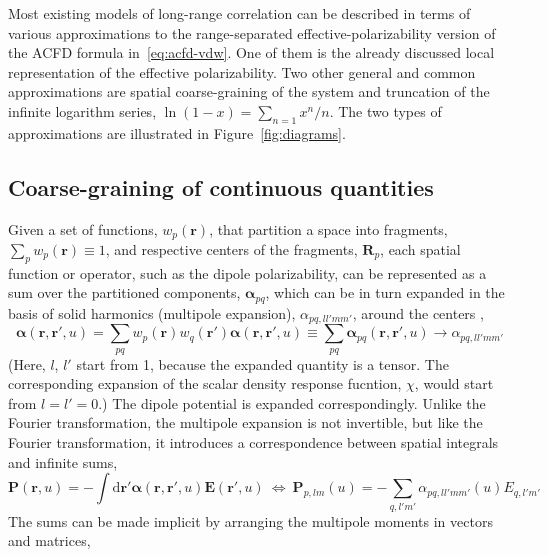 Most existing models of long-range correlation can be described in terms of various approximations to the range-separated effective-polarizability version of the ACFD formula in~\eqref{eq:acfd-vdw}.
One of them is the already discussed local representation of the effective polarizability.
Two other general and common approximations are spatial coarse-graining of the system and truncation of the infinite logarithm series, $\ln(1-x)=\sum_{n=1}x^n/n$.
The two types of approximations are illustrated in Figure~\ref{fig:diagrams}.

\subsection{Coarse-graining of continuous quantities}\label{sec:coarse-graining}

Given a set of functions, $w_p(\mathbf r)$, that partition a space into fragments, $\sum_p w_p(\mathbf r)\equiv1$, and respective centers of the fragments, $\mathbf R_p$, each spatial function or operator, such as the dipole polarizability, can be represented as a sum over the partitioned components, $\boldsymbol\alpha_{pq}$, which can be in turn expanded in the basis of solid harmonics (multipole expansion), $\alpha_{pq,ll'mm'}$, around the centers \citep{Stone13},
\begin{equation}
  \boldsymbol\alpha(\mathbf r,\mathbf r',u)=\sum_{pq}w_p(\mathbf r)w_q(\mathbf r')\boldsymbol\alpha(\mathbf r,\mathbf r',u)\equiv\sum_{pq}\boldsymbol\alpha_{pq}(\mathbf r,\mathbf r',u)\rightarrow\alpha_{pq,ll'mm'}
\end{equation}
(Here, $l$, $l'$ start from 1, because the expanded quantity is a tensor.
The corresponding expansion of the scalar density response fucntion, $\chi$, would start from $l=l'=0$.)
The dipole potential is expanded correspondingly.
Unlike the Fourier transformation, the multipole expansion is not invertible, but like the Fourier transformation, it introduces a correspondence between spatial integrals and infinite sums,
\begin{equation}
  \mathbf P(\mathbf r,u)=-\int\mathrm d\mathbf r'\boldsymbol\alpha(\mathbf r,\mathbf r',u)\mathbf E(\mathbf r',u)
  \ \Leftrightarrow\ 
  \mathbf P_{p,lm}(u)=-\sum_{q,l'm'}\alpha_{pq,ll'mm'}(u)E_{q,l'm'}
\end{equation}
The sums can be made implicit by arranging the multipole moments in vectors and matrices,
